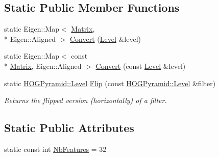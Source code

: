 \subsection*{Static Public Member Functions}
\begin{DoxyCompactItemize}
\item 
static Eigen\-::\-Map$<$ \hyperlink{class_f_f_l_d_1_1_h_o_g_pyramid_a2618b4bd5d17f05cdc108189ed5abe3a}{Matrix}, \\*
Eigen\-::\-Aligned $>$ \hyperlink{class_f_f_l_d_1_1_h_o_g_pyramid_a95908d95147f370b708886757f2a761d}{Convert} (\hyperlink{class_f_f_l_d_1_1_h_o_g_pyramid_a1cd36670adf29538f44dfa434695ec34}{Level} \&level)
\item 
static Eigen\-::\-Map$<$ const \\*
\hyperlink{class_f_f_l_d_1_1_h_o_g_pyramid_a2618b4bd5d17f05cdc108189ed5abe3a}{Matrix}, Eigen\-::\-Aligned $>$ \hyperlink{class_f_f_l_d_1_1_h_o_g_pyramid_a362ffc5ea00d23021947666ffb55060c}{Convert} (const \hyperlink{class_f_f_l_d_1_1_h_o_g_pyramid_a1cd36670adf29538f44dfa434695ec34}{Level} \&level)
\item 
\hypertarget{class_f_f_l_d_1_1_h_o_g_pyramid_aec98ef9669e289f2aa30235fdbe0df87}{static \hyperlink{class_f_f_l_d_1_1_h_o_g_pyramid_a1cd36670adf29538f44dfa434695ec34}{H\-O\-G\-Pyramid\-::\-Level} \hyperlink{class_f_f_l_d_1_1_h_o_g_pyramid_aec98ef9669e289f2aa30235fdbe0df87}{Flip} (const \hyperlink{class_f_f_l_d_1_1_h_o_g_pyramid_a1cd36670adf29538f44dfa434695ec34}{H\-O\-G\-Pyramid\-::\-Level} \&filter)}\label{class_f_f_l_d_1_1_h_o_g_pyramid_aec98ef9669e289f2aa30235fdbe0df87}

\begin{DoxyCompactList}\small\item\em Returns the flipped version (horizontally) of a filter. \end{DoxyCompactList}\end{DoxyCompactItemize}
\subsection*{Static Public Attributes}
\begin{DoxyCompactItemize}
\item 
static const int \hyperlink{class_f_f_l_d_1_1_h_o_g_pyramid_a418ebc8cf8781a3874f50b5eac482c68}{Nb\-Features} = 32
\end{DoxyCompactItemize}


